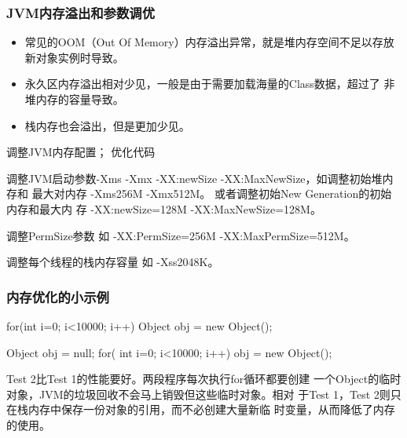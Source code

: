 \begin{frame}[fragile] %
\frametitle{JVM内存溢出和参数调优}


\begin{itemize}[<+-| structure@+>]
\item 常见的OOM（Out Of Memory）内存溢出异常，就是堆内存空间不足以存放新对象实例时导致。
\item 永久区内存溢出相对少见，一般是由于需要加载海量的Class数据，超过了
  非堆内存的容量导致。
 \item 栈内存也会溢出，但是更加少见。
\end{itemize}

  调整JVM内存配置； 优化代码


\pause
\begin{description}\scriptsize
\item[堆内存优化] 调整JVM启动参数-Xms -Xmx -XX:newSize -XX:MaxNewSize，如调整初始堆内存和
  最大对内存 -Xms256M -Xmx512M。 或者调整初始New Generation的初始内存和最大内
  存 -XX:newSize=128M -XX:MaxNewSize=128M。
 \item[永久区内存优化] 调整PermSize参数   如  -XX:PermSize=256M -XX:MaxPermSize=512M。
 \item[栈内存优化] 调整每个线程的栈内存容量  如  -Xss2048K。
\end{description}
\end{frame}

\begin{frame}[fragile] %
  \frametitle{内存优化的小示例}



  \begin{javaCode}
    for(int i=0; i<10000; i++) {
      Object obj = new Object(); 
    }
  \end{javaCode}
  
  
  \begin{javaCode}
    Object obj = null; 
    for( int i=0; i<10000; i++) {
      obj = new Object(); 
    }
  \end{javaCode}

  \pause 
  
  {\small\kai Test 2比Test 1的性能要好。两段程序每次执行for循环都要创建
    一个Object的临时对象，JVM的垃圾回收不会马上销毁但这些临时对象。相对
    于Test 1，Test 2则只在栈内存中保存一份对象的引用，而不必创建大量新临
    时变量，从而降低了内存的使用。}
\end{frame}

